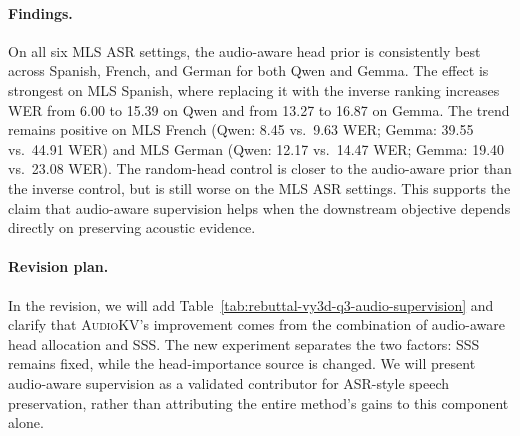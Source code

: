 \paragraph{Findings.}
On all six MLS ASR settings, the audio-aware head prior is consistently best across Spanish, French, and German for both Qwen and Gemma.
The effect is strongest on MLS Spanish, where replacing it with the inverse ranking increases WER from 6.00 to 15.39 on Qwen and from 13.27 to 16.87 on Gemma.
The trend remains positive on MLS French (Qwen: 8.45 vs.\ 9.63 WER; Gemma: 39.55 vs.\ 44.91 WER) and MLS German (Qwen: 12.17 vs.\ 14.47 WER; Gemma: 19.40 vs.\ 23.08 WER).
The random-head control is closer to the audio-aware prior than the inverse control, but is still worse on the MLS ASR settings.
This supports the claim that audio-aware supervision helps when the downstream objective depends directly on preserving acoustic evidence.

\paragraph{Revision plan.}
In the revision, we will add Table~\ref{tab:rebuttal-vy3d-q3-audio-supervision} and clarify that \textsc{AudioKV}'s improvement comes from the combination of audio-aware head allocation and SSS.
The new experiment separates the two factors: SSS remains fixed, while the head-importance source is changed.
We will present audio-aware supervision as a validated contributor for ASR-style speech preservation, rather than attributing the entire method's gains to this component alone.
